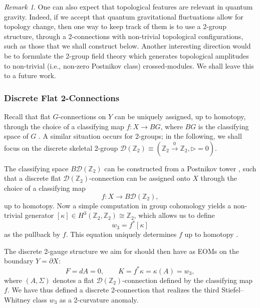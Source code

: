 \documentclass[onecolumn]{article}
\theoremstyle{theorem}
\theoremstyle{remark}
\newtheorem{remark}{Remark}[section]
\theoremstyle{example}
\theoremstyle{definition}
\numberwithin{equation}{section}
\def\bbZ{\mathbb{Z}}
\begin{document}
\begin{remark}
One can also expect that topological features are  relevant in quantum gravity. Indeed, if we accept that quantum gravitational fluctuations allow for topology change, then one way to keep track of them is to use a 2-group structure, through a  2-connections with non-trivial topological configurations, such as those that we shall construct below.  Another interesting direction   would be to formulate the 2-group field theory \cite{Girelli:2022bdf} which generates topological amplitudes to non-trivial (i.e., non-zero Postnikov class) crossed-modules. We shall leave this to a future work.
\end{remark}


\subsubsection{Discrete Flat 2-Connections} 
Recall that flat $G$-connections on $Y$ can be uniquely assigned, up to homotopy, through the choice of a classifying map $f:X\rightarrow BG$, where $BG$ is the classifying space of $G$ \cite{book-algtop}. A similar situation occurs for 2-groups; in the following, we shall focus on the discrete skeletal 2-group $\mathcal{D}(\bbZ_2)\equiv (\bbZ_2\xrightarrow{0}\bbZ_2,\rhd=0)$.

The classifying space $B\mathcal{D}(\bbZ_2)$ can be constructed from a Postnikov tower \cite{Kapustin:2013uxa,Zhu:2019,Brown}, such that a discrete flat $\mathcal{D}(\bbZ_2)$-connection can be assigned onto $X$ through the choice of a classifying map \cite{Kapustin:2013uxa,Zhu:2019,Mackaay:uo}
\begin{equation}
    f: X\rightarrow B\mathcal{D}(\bbZ_2),\nonumber
\end{equation}
up to homotopy. Now a simple computation in group cohomology \cite{book-groupcohomology} yields a non-trivial generator $[\kappa]\in H^3(\bbZ_2,\bbZ_2)\cong\bbZ_2$, which allows us to define
\begin{equation}
    w_3=f^*[\kappa]\label{3sw}
\end{equation}
as the pullback by $f$. This equation uniquely determines $f$ up to homotopy \cite{Kapustin:2013uxa}.

The discrete 2-gauge structure we aim for should then have as EOMs on the boundary $Y=\partial X$:
\begin{equation}
    F =dA=0,\qquad K =f^*\kappa = \kappa(A)= w_3,\nonumber
\end{equation}
where $(A,\Sigma)$ denotes a flat $\mathcal{D}(\bbZ_2)$-connection defined by the classifying map $f$. We have thus defined a discrete 2-connection that realizes the third Stiefel--Whitney class $w_3$ as a 2-curvature anomaly.
\end{document}
